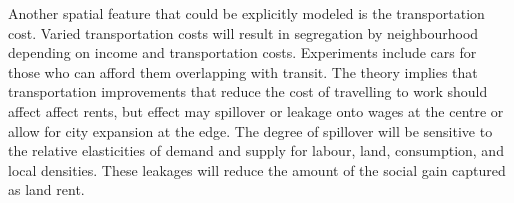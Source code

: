 Another spatial feature that could be explicitly modeled is %
the transportation cost. %
Varied transportation costs will result in segregation by neighbourhood depending on income and transportation costs. Experiments include cars for those who can afford them overlapping with transit. %
The theory implies that transportation improvements that reduce the cost of travelling to work should  affect affect rents, but effect may spillover or leakage  onto wages  at the centre or allow for city expansion at the edge.   
The degree of spillover will be sensitive to the relative elasticities of demand and supply  for labour, land, consumption, and local densities. These leakages will reduce the amount of the social gain captured as land rent. %

